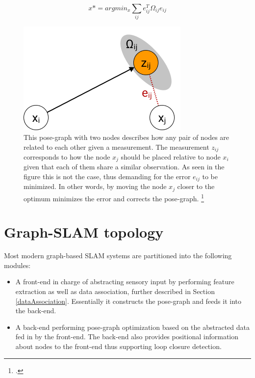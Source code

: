 \begin{equation}\label{leastSquares}
	x* = argmin_{x} \sum_{ij}e_{ij}^{T} \Omega_{ij} e_{ij}
\end{equation}


\begin{figure}
	\centering
	\includegraphics[width=0.4\linewidth]{img/PoseGraphOptimization}
	\caption{
		This pose-graph with two nodes describes how any pair of nodes are related to each other given a measurement. The measurement $ z_{ij} $ corresponds to how the node $x_{j}$ should be placed relative to node $x_{i}$ given that each of them share a similar observation. As seen in the figure this is not the case, thus demanding for the error $e_{ij}$ to be minimized. In other words, by moving the node $x_{j}$ closer to the optimum minimizes the error and corrects the pose-graph. \footcite{grisetti2010graphSLAM}
	}
	\label{fig:poseGraphOptimization}
\end{figure}


\section{Graph-SLAM topology}
Most modern graph-based SLAM systems are partitioned into the following modules:
\begin{itemize}
	\item A front-end in charge of abstracting sensory input by performing feature extraction as well as data association, further described in Section \ref{dataAssociation}. Essentially it constructs the pose-graph and feeds it into the back-end.
	\item A back-end performing pose-graph optimization based on the abstracted data fed in by the front-end. The back-end also provides positional information about nodes to the front-end thus supporting loop closure detection. 
\end{itemize}

